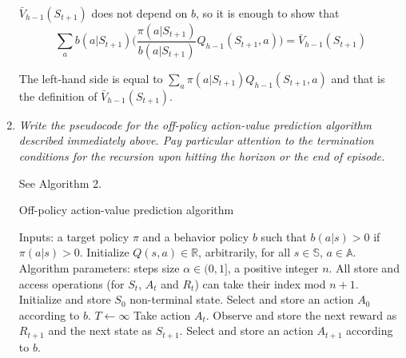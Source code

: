 \documentclass[12pt,a4paper]{article}
\begin{document}
\begin{enumerate}
    $\bar{V}_{h - 1}(S_{t + 1})$ does not depend on $b$, so it is enough to show
    that
    \[\sum\limits_a b(a|S_{t + 1}) \Big(\frac{\pi(a | S_{t + 1})}{b(a | S_{t + 1})} Q_{h - 1}(S_{t + 1}, a)\Big) = \bar{V}_{h - 1}(S_{t + 1})
    \]

    The left-hand side is equal to $\sum\limits_a \pi(a | S_{t + 1})Q_{h - 1}(S_{t + 1}, a)$ and that is the definition of $\bar{V}_{h - 1}(S_{t + 1})$.

  \item
    \textit{Write the pseudocode for the off-policy action-value prediction algorithm
    described immediately above. Pay particular attention to the termination
    conditions for the recursion upon hitting the horizon or the end of episode.}

    See Algorithm 2.

    \begin{algorithm}
      \caption{Off-policy action-value prediction algorithm}
      \begin{algorithmic}
        \STATE Inputs: a target policy $\pi$ and a behavior policy $b$ such that
        \STATE $b(a|s) > 0$ if $\pi(a|s) > 0$.
        \STATE Initialize $Q(s, a) \in \mathbb{R}$, arbitrarily, for all
        $s \in \mathbb{S}$, $a \in \mathbb{A}$.
        \STATE Algorithm parameters: steps size $\alpha \in (0, 1]$, a positive
        integer $n$.
        \STATE All store and access operations (for $S_t$, $A_t$ and $R_t$) can take their index mod $n + 1$.
          \STATE Initialize and store $S_0$ non-terminal state.
          \STATE Select and store an action $A_0$ according to $b$.
          \STATE $T \leftarrow \infty$
              \STATE Take action $A_t$.
              \STATE Observe and store the next reward as $R_{t + 1}$ and the
              next state as $S_{t + 1}$.
              \ELSE
                \STATE Select and store an action $A_{t + 1}$ according to $b$.
              \ENDIF
            \ENDIF
              \ELSE
              \ENDIF
              \ENDFOR
            \ENDIF
            \ENDIF
            \ENDFOR
        \ENDFOR
      \end{algorithmic}
    \end{algorithm}

\end{enumerate}
\end{document}
